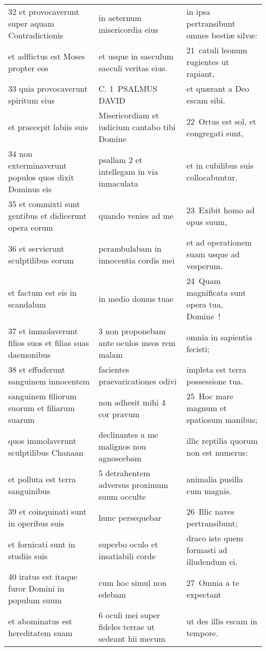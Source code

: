 \documentclass{article}
\begin{document}
\begin{longtable}{@{}p{}p{}p{}@{}}
32 et provocaverunt super aquam Contradictionis	&	in aeternum misericordia eius	&	in ipsa pertransibunt omnes bestiæ silvæ:	\\
et adflictus est Moses propter eos	&	et usque in saeculum saeculi veritas eius.	&	21 catuli leonum rugientes ut rapiant,	\\
33 quia provocaverunt spiritum eius	&	C. 1 PSALMUS DAVID	&	et quærant a Deo escam sibi.	\\
et praecepit labiis suis	&	Misericordiam et iudicium cantabo tibi Domine	&	22 Ortus est sol, et congregati sunt,	\\
34 non exterminaverunt populos quos dixit Dominus eis	&	psallam 2 et intellegam in via inmaculata	&	et in cubilibus suis collocabuntur.	\\
35 et commixti sunt gentibus et didicerunt opera eorum	&	quando venies ad me	&	23 Exibit homo ad opus suum,	\\
36 et servierunt sculptilibus eorum	&	perambulabam in innocentia cordis mei	&	et ad operationem suam usque ad vesperum.	\\
et factum est eis in scandalum	&	in medio domus tuae	&	24 Quam magnificata sunt opera tua, Domine !	\\
37 et immolaverunt filios suos et filias suas daemonibus	&	3 non proponebam ante oculos meos rem malam	&	omnia in sapientia fecisti;	\\
38 et effuderunt sanguinem innocentem	&	facientes praevaricationes odivi	&	impleta est terra possessione tua.	\\
sanguinem filiorum suorum et filiarum suarum	&	non adhesit mihi 4 cor pravum	&	25 Hoc mare magnum et spatiosum manibus;	\\
quos immolaverunt sculptilibus Chanaan	&	declinantes a me malignos non agnoscebam	&	illic reptilia quorum non est numerus:	\\
et polluta est terra sanguinibus	&	5 detrahentem adversus proximum suum occulte	&	animalia pusilla cum magnis.	\\
39 et coinquinati sunt in operibus suis	&	hunc persequebar	&	26 Illic naves pertransibunt;	\\
et fornicati sunt in studiis suis	&	superbo oculo et insatiabili corde	&	draco iste quem formasti ad illudendum ei.	\\
40 iratus est itaque furor Domini in populum suum	&	cum hoc simul non edebam	&	27 Omnia a te expectant	\\
et abominatus est hereditatem suam	&	6 oculi mei super fideles terrae ut sedeant hii mecum	&	ut des illis escam in tempore.	\\

\end{longtable}
\end{document}
